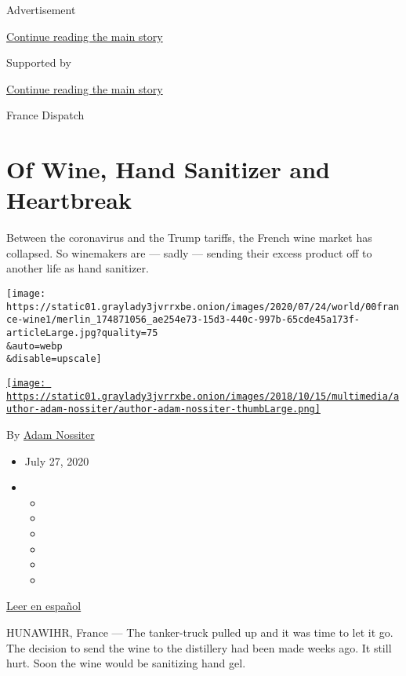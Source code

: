 Advertisement

\protect\hyperlink{after-top}{Continue reading the main story}

Supported by

\protect\hyperlink{after-sponsor}{Continue reading the main story}

France Dispatch

\hypertarget{of-wine-hand-sanitizer-and-heartbreak}{%
\section{Of Wine, Hand Sanitizer and
Heartbreak}\label{of-wine-hand-sanitizer-and-heartbreak}}

Between the coronavirus and the Trump tariffs, the French wine market
has collapsed. So winemakers are --- sadly --- sending their excess
product off to another life as hand sanitizer.

\texttt{[image: https://static01.graylady3jvrrxbe.onion/images/2020/07/24/world/00france-wine1/merlin\_174871056\_ae254e73-15d3-440c-997b-65cde45a173f-articleLarge.jpg?quality=75\\\&auto=webp\\\&disable=upscale]}

\href{https://www.nytimes3xbfgragh.onion/by/adam-nossiter}{\texttt{[image: https://static01.graylady3jvrrxbe.onion/images/2018/10/15/multimedia/author-adam-nossiter/author-adam-nossiter-thumbLarge.png]}}

By \href{https://www.nytimes3xbfgragh.onion/by/adam-nossiter}{Adam
Nossiter}

\begin{itemize}
\item
  July 27, 2020
\item
  \begin{itemize}
  \item
  \item
  \item
  \item
  \item
  \item
  \end{itemize}
\end{itemize}

\href{https://www.nytimes3xbfgragh.onion/es/2020/07/28/espanol/mundo/vino-blanco-alsacia-coronavirus.html}{Leer
en español}

HUNAWIHR, France --- The tanker-truck pulled up and it was time to let
it go. The decision to send the wine to the distillery had been made
weeks ago. It still hurt. Soon the wine would be sanitizing hand gel.

